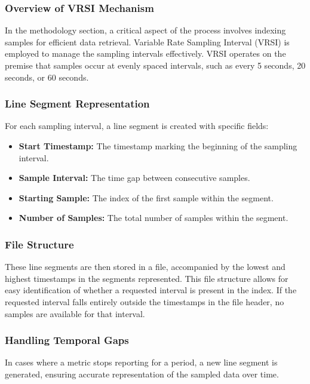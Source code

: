 \documentclass[conference]{IEEEtran}
\begin{document}
\subsubsection{Overview of VRSI Mechanism}

In the methodology section, a critical aspect of the process involves indexing samples for efficient data retrieval. Variable Rate Sampling Interval (VRSI) is employed to manage the sampling intervals effectively. VRSI operates on the premise that samples occur at evenly spaced intervals, such as every 5 seconds, 20 seconds, or 60 seconds.

\subsubsection{Line Segment Representation}

For each sampling interval, a line segment is created with specific fields:

\begin{itemize}
    \item \textbf{Start Timestamp:} The timestamp marking the beginning of the sampling interval.
    \item \textbf{Sample Interval:} The time gap between consecutive samples.
    \item \textbf{Starting Sample:} The index of the first sample within the segment.
    \item \textbf{Number of Samples:} The total number of samples within the segment.
\end{itemize}

\subsubsection{File Structure}

These line segments are then stored in a file, accompanied by the lowest and highest timestamps in the segments represented. This file structure allows for easy identification of whether a requested interval is present in the index. If the requested interval falls entirely outside the timestamps in the file header, no samples are available for that interval.

\subsubsection{Handling Temporal Gaps}

In cases where a metric stops reporting for a period, a new line segment is generated, ensuring accurate representation of the sampled data over time.
\end{document}

